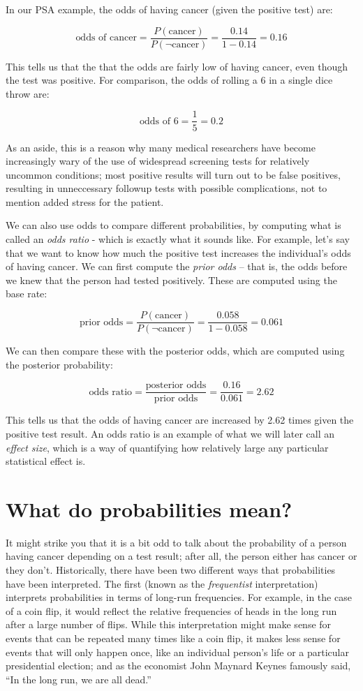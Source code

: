 \documentclass[
  12pt,
]{book}
\begin{document}
In our PSA example, the odds of having cancer (given the positive test) are:

\[
\text{odds of cancer} = \frac{P(\text{cancer})}{P(\neg \text{cancer})} =\frac{0.14}{1 - 0.14} = 0.16
\]

This tells us that the that the odds are fairly low of having cancer, even though the test was positive. For comparison, the odds of rolling a 6 in a single dice throw are:

\[
\text{odds of 6} = \frac{1}{5} = 0.2
\]

As an aside, this is a reason why many medical researchers have become increasingly wary of the use of widespread screening tests for relatively uncommon conditions; most positive results will turn out to be false positives, resulting in unneccessary followup tests with possible complications, not to mention added stress for the patient.

We can also use odds to compare different probabilities, by computing what is called an \emph{odds ratio} - which is exactly what it sounds like. For example, let's say that we want to know how much the positive test increases the individual's odds of having cancer. We can first compute the \emph{prior odds} -- that is, the odds before we knew that the person had tested positively. These are computed using the base rate:

\[
\text{prior odds} = \frac{P(\text{cancer})}{P(\neg \text{cancer})} =\frac{0.058}{1 - 0.058} = 0.061
\]

We can then compare these with the posterior odds, which are computed using the posterior probability:

\[
\text{odds ratio} = \frac{\text{posterior odds}}{\text{prior odds}} = \frac{0.16}{0.061} = 2.62
\]

This tells us that the odds of having cancer are increased by 2.62 times given the positive test result. An odds ratio is an example of what we will later call an \emph{effect size}, which is a way of quantifying how relatively large any particular statistical effect is.

\hypertarget{what-do-probabilities-mean}{%
\section{What do probabilities mean?}\label{what-do-probabilities-mean}}

It might strike you that it is a bit odd to talk about the probability of a person having cancer depending on a test result; after all, the person either has cancer or they don't. Historically, there have been two different ways that probabilities have been interpreted. The first (known as the \emph{frequentist} interpretation) interprets probabilities in terms of long-run frequencies. For example, in the case of a coin flip, it would reflect the relative frequencies of heads in the long run after a large number of flips. While this interpretation might make sense for events that can be repeated many times like a coin flip, it makes less sense for events that will only happen once, like an individual person's life or a particular presidential election; and as the economist John Maynard Keynes famously said, ``In the long run, we are all dead.''
\end{document}
